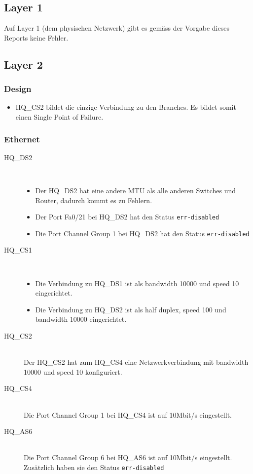 \subsection{Layer 1}
Auf Layer 1 (dem physischen Netzwerk) gibt es gemäss der Vorgabe dieses Reports keine Fehler.

\subsection{Layer 2}
\subsubsection{Design}
\begin{itemize}
	\item HQ\_CS2 bildet die einzige Verbindung zu den Branches. Es bildet somit einen Single Point of Failure.
\end{itemize}

\subsubsection{Ethernet}

\begin{description}
	\item[HQ\_DS2] \hfill \\
	  \begin{itemize}
	    \item Der HQ\_DS2 hat eine andere MTU als alle anderen Switches und Router, dadurch kommt es zu Fehlern.
	    \item Der Port Fa0/21 bei HQ\_DS2 hat den Status \lstinline|err-disabled|
	    \item Die Port Channel Group 1 bei HQ\_DS2 hat den Status \lstinline|err-disabled|
          \end{itemize}
	\item[HQ\_CS1] \hfill \\
		\begin{itemize}
			\item Die Verbindung zu HQ\_DS1 ist als bandwidth 10000 und speed 10 eingerichtet.
			\item Die Verbindung zu HQ\_DS2 ist als half duplex, speed 100 und bandwidth 10000 eingerichtet.
		\end{itemize}
	\item[HQ\_CS2] \hfill \\
	 Der HQ\_CS2 hat zum HQ\_CS4 eine Netzwerkverbindung mit bandwidth 10000 und speed 10 konfiguriert.
	\item[HQ\_CS4] \hfill \\
		Die Port Channel Group 1 bei HQ\_CS4 ist auf 10Mbit/s eingestellt. 
	\item[HQ\_AS6] \hfill \\
		Die Port Channel Group 6 bei HQ\_AS6 ist auf 10Mbit/s eingestellt. Zusätzlich haben sie den Status \lstinline|err-disabled|
\end{description}

